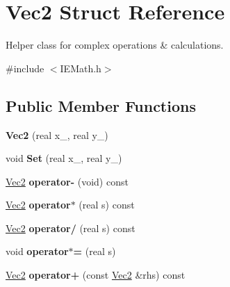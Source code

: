 \hypertarget{struct_vec2}{}\section{Vec2 Struct Reference}
\label{struct_vec2}


Helper class for complex operations \& calculations.  




{\ttfamily \#include $<$I\+E\+Math.\+h$>$}

\subsection*{Public Member Functions}
\begin{DoxyCompactItemize}
\item 
\mbox{\label{struct_vec2_aa8f28d71ea06633d83c6763122706e4c}} 
{\bfseries Vec2} (real x\+\_\+, real y\+\_\+)
\item 
\mbox{\label{struct_vec2_acc6bbf6848ff83d15304700d30ea0777}} 
void {\bfseries Set} (real x\+\_\+, real y\+\_\+)
\item 
\mbox{\label{struct_vec2_abdef2ee4f2eb705a87fe65df3451abdd}} 
\mbox{\hyperlink{struct_vec2}{Vec2}} {\bfseries operator-\/} (void) const
\item 
\mbox{\label{struct_vec2_a8b9af5c711b30c06184af69a3e90884a}} 
\mbox{\hyperlink{struct_vec2}{Vec2}} {\bfseries operator$\ast$} (real s) const
\item 
\mbox{\label{struct_vec2_aa188e924fa13e126f5078f92297bcc70}} 
\mbox{\hyperlink{struct_vec2}{Vec2}} {\bfseries operator/} (real s) const
\item 
\mbox{\label{struct_vec2_a689c054f9e6c48c5c6d1801e63607164}} 
void {\bfseries operator$\ast$=} (real s)
\item 
\mbox{\label{struct_vec2_acc8d06b96e3f84cd0cb11e5a17fd046b}} 
\mbox{\hyperlink{struct_vec2}{Vec2}} {\bfseries operator+} (const \mbox{\hyperlink{struct_vec2}{Vec2}} \&rhs) const
\item 
\mbox{\label{struct_vec2_add2fd6c94aebeac420f76e21ea02fbd8}} 

\end{DoxyCompactItemize}

